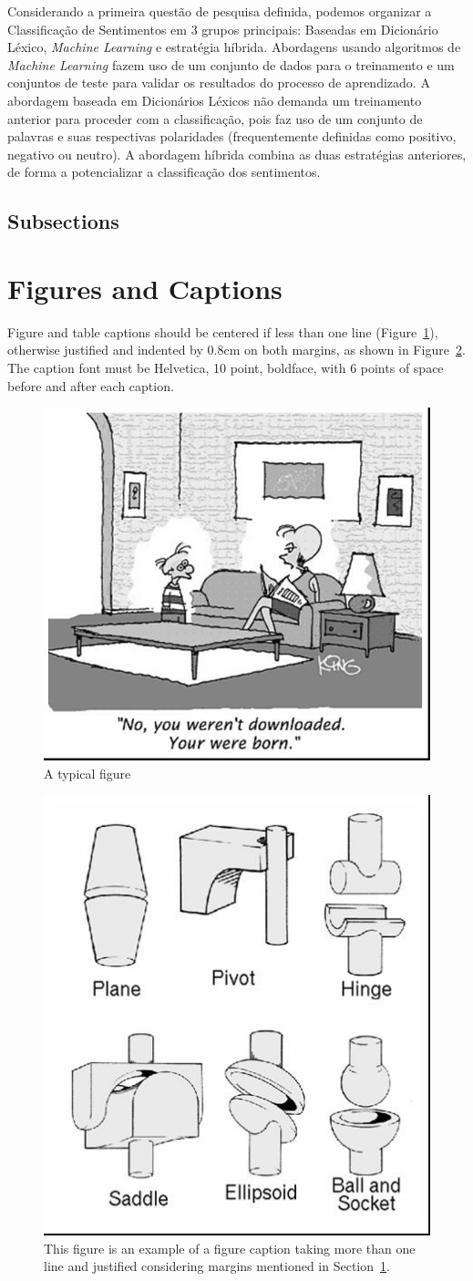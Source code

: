 \documentclass[12pt]{article}
\begin{document}
Considerando a primeira questão de pesquisa definida, podemos organizar a Classificação de Sentimentos em 3 grupos principais: Baseadas em Dicionário Léxico, \emph{Machine Learning} e estratégia híbrida. Abordagens usando algoritmos de \emph{Machine Learning} fazem uso de um conjunto de dados para o treinamento e um conjuntos de teste para validar os resultados do processo de aprendizado. A abordagem baseada em Dicionários Léxicos não demanda um treinamento anterior para proceder com a classificação, pois faz uso de um conjunto de palavras e suas respectivas polaridades (frequentemente definidas como positivo, negativo ou neutro). A abordagem híbrida combina as duas estratégias anteriores, de forma a potencializar a classificação dos sentimentos.

\subsection{Subsections}

\section{Figures and Captions}\label{sec:figs}


Figure and table captions should be centered if less than one line
(Figure~\ref{fig:exampleFig1}), otherwise justified and indented by 0.8cm on
both margins, as shown in Figure~\ref{fig:exampleFig2}. The caption font must
be Helvetica, 10 point, boldface, with 6 points of space before and after each
caption.

\begin{figure}[ht]
\centering
\includegraphics[width=.5\textwidth]{fig1.jpg}
\caption{A typical figure}
\label{fig:exampleFig1}
\end{figure}

\begin{figure}[ht]
\centering
\includegraphics[width=.3\textwidth]{fig2.jpg}
\caption{This figure is an example of a figure caption taking more than one
  line and justified considering margins mentioned in Section~\ref{sec:figs}.}
\label{fig:exampleFig2}
\end{figure}
\end{document}
